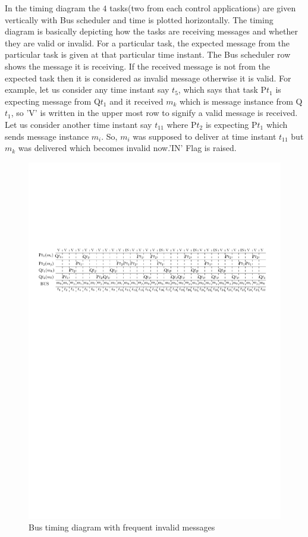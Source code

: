 In the timing diagram the $4$ tasks(two from each control applications) are given vertically with
Bus scheduler and time is plotted horizontally. The timing diagram is basically depicting how the
tasks are receiving messages and whether they are valid or invalid. For a particular task, the 
expected message from the particular task is given at that particular time instant. The Bus scheduler
row shows the message it is receiving. If the received message is not from the expected task then 
it is considered as invalid message otherwise it is valid. For example, let us consider any time 
instant say $t_5$, which says that task P$t_1$ is expecting message from Q$t_1$ and it received
$m_k$ which is message instance from Q$t_1$, so 'V' is written in the upper most row to signify 
a valid message is received. Let us consider another time instant say $t_{11}$ where P$t_2$ is 
expecting P$t_1$ which sends message instance $m_i$. So, $m_i$ was supposed to deliver at time 
instant $t_{11}$ but $m_k$ was delivered which becomes invalid now.'IN' Flag is raised.

\begin{figure}
\begin{center}
\includegraphics[width=130mm]{prob_1_timing_diagram_2.pdf}
\end{center}
\caption{Bus timing diagram with frequent invalid messages}
\label{dig2}
\end{figure}

